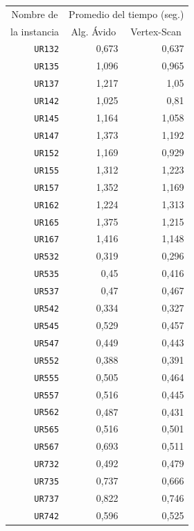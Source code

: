 \documentclass[11pt]{article}
\begin{document}
\begin{table}[htbp]
   \begin{center}
   \begin{tabular}{|r|r|r|}
   \hline
   \multicolumn{1}{|c|}{Nombre de} & \multicolumn{ 2}{c|}{Promedio del tiempo (seg.)} \\ \cline{2-3}
   \multicolumn{1}{|c|}{la instancia} & \multicolumn{1}{c|}{Alg. Ávido} & \multicolumn{1}{c|}{Vertex-Scan} \\ \hline
   \texttt{UR132} & 0,673 & 0,637 \\
   \texttt{UR135} & 1,096 & 0,965 \\
   \texttt{UR137} & 1,217 & 1,05 \\
   \texttt{UR142} & 1,025 & 0,81 \\
   \texttt{UR145} & 1,164 & 1,058 \\
   \texttt{UR147} & 1,373 & 1,192 \\
   \texttt{UR152} & 1,169 & 0,929 \\
   \texttt{UR155} & 1,312 & 1,223 \\
   \texttt{UR157} & 1,352 & 1,169 \\
   \texttt{UR162} & 1,224 & 1,313 \\
   \texttt{UR165} & 1,375 & 1,215 \\
   \texttt{UR167} & 1,416 & 1,148 \\
   \texttt{UR532} & 0,319 & 0,296 \\
   \texttt{UR535} & 0,45 & 0,416 \\
   \texttt{UR537} & 0,47 & 0,467 \\
   \texttt{UR542} & 0,334 & 0,327 \\
   \texttt{UR545} & 0,529 & 0,457 \\
   \texttt{UR547} & 0,449 & 0,443 \\
   \texttt{UR552} & 0,388 & 0,391 \\
   \texttt{UR555} & 0,505 & 0,464 \\
   \texttt{UR557} & 0,516 & 0,445 \\
   \texttt{UR562} & 0,487 & 0,431 \\
   \texttt{UR565} & 0,516 & 0,501 \\
   \texttt{UR567} & 0,693 & 0,511 \\
   \texttt{UR732} & 0,492 & 0,479 \\
   \texttt{UR735} & 0,737 & 0,666 \\
   \texttt{UR737} & 0,822 & 0,746 \\
   \texttt{UR742} & 0,596 & 0,525 \\

\end{tabular}
\end{center}
\end{table}
\end{document}
